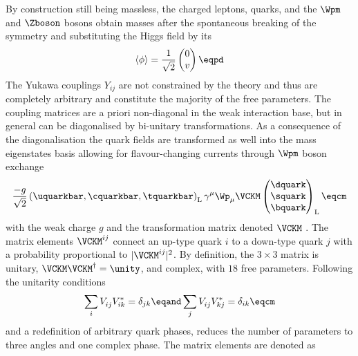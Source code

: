 By construction still being massless, the charged leptons, quarks, and the
$\Wpm$ and $\Zboson$ bosons obtain masses after the spontaneous breaking of the
symmetry and substituting the Higgs field by its \VEV
%
\begin{equation}\label{sec:cpv_theory:flavour_physics:ckm_matrix:higgs_vev}
  \langle\phi\rangle = \frac{1}{\sqrt{2}} \begin{pmatrix}
    0 \\
    v \\
  \end{pmatrix}\eqpd
\end{equation}
%
The Yukawa couplings $Y_{ij}$ are not constrained by the theory and thus are
completely arbitrary and constitute the majority of the free \SM parameters. The
coupling matrices are a priori non-diagonal in the weak interaction base, but in
general can be diagonalised by bi-unitary transformations. As a consequence of
the diagonalisation the quark fields are transformed as well into the mass
eigenstates basis allowing for flavour-changing currents through $\Wpm$ boson
exchange
%
\begin{equation}
  \frac{-g}{\sqrt{2}} \left( \uquarkbar, \cquarkbar, \tquarkbar \right)_{\text{L}} \gamma^\mu \Wp_\mu \VCKM 
  \begin{pmatrix}
    \dquark \\
    \squark \\
    \bquark \\
  \end{pmatrix}_{\text{L}} \eqcm
\end{equation}
%
with the weak charge $g$ and the transformation matrix denoted $\VCKM$
\cite{Cabibbo:1963yz,Kobayashi:1973fv}. The \CKM matrix elements $\VCKM^{ij}$
connect an up-type quark $i$ to a down-type quark $j$ with a probability
proportional to $\vert\VCKM^{ij}\vert^2$. By definition, the $3 \times 3$ \CKM
matrix is unitary, $\VCKM\VCKM^\dagger=\unity$, and complex, with $\num{18}$
free parameters. Following the unitarity conditions
%
\begin{equation}\label{sec:cpv_theory:flavour_physics:ckm_matrix:unitarity_relations}
  \sum_i V_{ij}^{\phantom{\ast}} V_{ik}^{\ast} = \delta_{jk} \eqand
  \sum_j V_{ij}^{\phantom{\ast}} V_{kj}^{\ast} = \delta_{ik} \eqcm
\end{equation}
%
and a redefinition of arbitrary quark phases, reduces the number of parameters
to three angles and one complex phase. The matrix elements are denoted as
%
